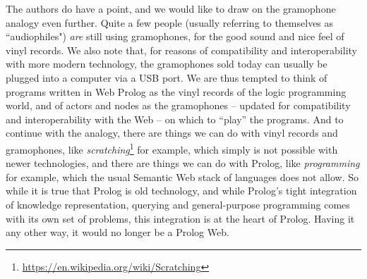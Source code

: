 \noindent The authors do have a point, and we would like to draw on the gramophone analogy even further. Quite a few people (usually referring to themselves as ``audiophiles") \textit{are} still using gramophones, for the good sound and nice feel of vinyl records. We also note that, for reasons of compatibility and interoperability with more modern technology, the gramophones sold today can usually be plugged into a computer via a USB port. We are thus tempted to think of programs written in Web Prolog as the vinyl records of the logic programming world, and of actors and nodes as the gramophones -- updated for compatibility and interoperability with the Web -- on which to ``play'' the programs. And to continue with the analogy, there are things we can do with vinyl records and gramophones, like \textit{scratching}\footnote{\url{https://en.wikipedia.org/wiki/Scratching}} for example, which simply is not possible with newer technologies, and there are things we can do with Prolog, like \textit{programming} for example, which the usual Semantic Web stack of languages does not allow. So while it is true that Prolog is old technology, and while Prolog's tight integration of knowledge representation, querying and general-purpose programming comes with its own set of problems, this integration is at the heart of Prolog. Having it any other way, it would no longer be a Prolog Web.



